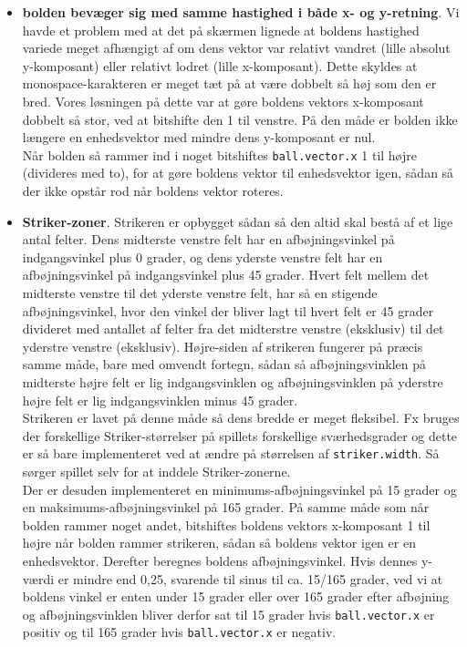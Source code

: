 \begin{itemize}
\item \textbf{bolden bevæger sig med samme hastighed i både x- og y-retning}. Vi havde et problem med at det på skærmen lignede at boldens hastighed variede meget afhængigt af om dens vektor var relativt vandret (lille absolut y-komposant) eller relativt lodret (lille x-komposant). Dette skyldes at monospace-karakteren er meget tæt på at være dobbelt så høj som den er bred. Vores løsningen på dette var at gøre boldens vektors x-komposant dobbelt så stor, ved at bitshifte den 1 til venstre. På den måde er bolden ikke længere en enhedsvektor med mindre dens y-komposant er nul.\\
Når bolden så rammer ind i noget bitshiftes \texttt{ball.vector.x} 1 til højre (divideres med to), for at gøre boldens vektor til enhedsvektor igen, sådan så der ikke opstår rod når boldens vektor roteres.

\item \textbf{Striker-zoner}. Strikeren er opbygget sådan så den altid skal bestå af et lige antal felter. Dens midterste venstre felt har en afbøjningsvinkel på indgangsvinkel plus 0 grader, og dens yderste venstre felt har en afbøjningsvinkel på indgangsvinkel plus 45 grader. Hvert felt mellem det midterste venstre til det yderste venstre felt, har så en stigende afbøjningsvinkel, hvor den vinkel der bliver lagt til hvert felt er 45 grader divideret med antallet af felter fra det midterstre venstre (eksklusiv) til det yderstre venstre (eksklusiv). Højre-siden af strikeren fungerer på præcis samme måde, bare med omvendt fortegn, sådan så afbøjningsvinklen på midterste højre felt er lig indgangsvinklen og afbøjningsvinklen på yderstre højre felt er lig indgangsvinklen minus 45 grader.\\
Strikeren er lavet på denne måde så dens bredde er meget fleksibel. Fx bruges der forskellige Striker-størrelser på spillets forskellige sværhedsgrader og dette er så bare implementeret ved at ændre på størrelsen af \texttt{striker.width}. Så sørger spillet selv for at inddele Striker-zonerne. \\

Der er desuden implementeret en minimums-afbøjningsvinkel på 15 grader og en maksimums-afbøjningsvinkel på 165 grader. På samme måde som når bolden rammer noget andet, bitshiftes boldens vektors x-komposant 1 til højre når bolden rammer strikeren, sådan så boldens vektor igen er en enhedsvektor. Derefter beregnes boldens afbøjningsvinkel. Hvis dennes y-værdi er mindre end 0,25, svarende til sinus til ca. 15/165 grader, ved vi at boldens vinkel er enten under 15 grader eller over 165 grader efter afbøjning og afbøjningsvinklen bliver derfor sat til 15 grader hvis \texttt{ball.vector.x} er positiv og til 165 grader hvis \texttt{ball.vector.x} er negativ.


\end{itemize}
